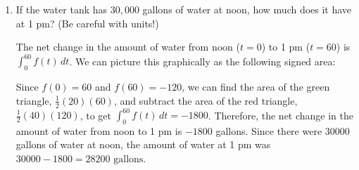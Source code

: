 \documentclass{article}
\begin{document}
\begin{enumerate}[topsep=0pt]
\begin{enumerate}[topsep=0pt]
    \begin{solution} 
      We are looking for a time $x$ when the net change in amount of water
      from noon to $x$ is 0; that is, we want $\displaystyle \int_0^x
      f(t)\,dt = 0$.  Graphically, we want to find the value of $x$ so
      that the signed area under $f(t)$ from $t = 0$ to $t = x$ is 0: 
      \begin{center}
      \end{center}
      By symmetry, we can see that $x = 40$, which corresponds to
      .
    \end{solution}

  \item
    \begin{problem}[\vfill\newpage]
      If the water tank has $30,000$ gallons of water at noon, how much
      does it have at 1 pm?  (Be careful with units!)
    \end{problem}

    \begin{solution}
      The net change in the amount of water from noon ($t = 0$) to 1 pm
      ($t = 60$) is $\displaystyle \int_{0}^{60} f(t)\,dt$.  We can
      picture this graphically as the following signed area:
      \begin{center}
      \end{center}
      Since $f(0) = 60$ and $f(60) = -120$, we can find the area of
      the green triangle, $\frac{1}{2}(20)(60)$, and subtract the area
      of the red triangle, $\frac{1}{2}(40)(120)$, to get
      $\displaystyle \int_{0}^{60} f(t)\,dt = -1800$.
      Therefore, the net change in the amount of water from noon
      to 1 pm is $-1800$ gallons.  Since there were $30000$ gallons of
      water at noon, the amount of water at 1 pm was $30000 - 1800 =
      \boxed{28200 \text{ gallons}}$. 
    \end{solution}


\end{enumerate}
\end{enumerate}
\end{document}
